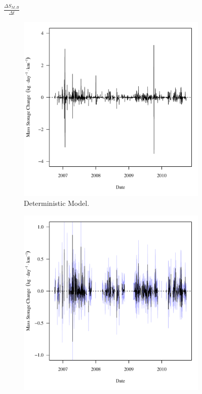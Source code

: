 \begin{linenumbers}
\subfiguremid
\begin{landscape}
	\begin{figure}
		$ \displaystyle \frac{\Delta S_{M,B}}{\Delta t} $
		\begin{subfigure}{0.7\textwidth}
			\centering
			\includegraphics[width=\tableCustomSize]{"Figures/Results_USR/Deterministic/f Segment B"}
			\caption{Deterministic Model.}
		\end{subfigure}%
		\begin{subfigure}{0.7\textwidth}
			\centering
			\includegraphics[width=\tableCustomSize]{"Figures/Results_USR/Stochastic/f Segment B"}

\end{subfigure}
\end{figure}
\end{landscape}
\end{linenumbers}
